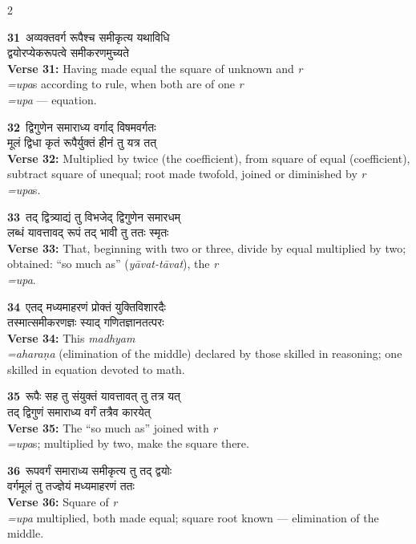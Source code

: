 \documentclass[11pt,a4paper]{article}
\newcommand{\dev}[1]{{\devanagarifont #1}}
\newcommand{\iast}[1]{\textit{#1}}
\newcommand{\vnum}[1]{\textcolor{versenumbercolor}{\textbf{#1}}}
\begin{document}
\begin{paracol}{2}

\switchcolumn[0]
\vnum{31}\ \dev{अव्यक्तवर्ग रूपैश्च समीकृत्य यथाविधि}\\
\dev{द्वयोरप्येकरूपत्वे समीकरणमुच्यते}\\
\switchcolumn[1]
\textbf{Verse 31:} Having made equal the square of unknown and \iast{r\\=upa}s according to rule, when both are of one \iast{r\\=upa} --- equation.

\switchcolumn[0]
\vnum{32}\ \dev{द्विगुणेन समाराध्य वर्गाद् विषमवर्गतः}\\
\dev{मूलं द्विधा कृतं रूपैर्युक्तं हीनं तु यत्र तत्}\\
\switchcolumn[1]
\textbf{Verse 32:} Multiplied by twice (the coefficient), from square of equal (coefficient), subtract square of unequal; root made twofold, joined or diminished by \iast{r\\=upa}s.

\switchcolumn[0]
\vnum{33}\ \dev{तद् द्वित्र्याद्यं तु विभजेद् द्विगुणेन समारधम्}\\
\dev{लब्धं यावत्तावद् रूपं तद् भावी तु ततः स्मृतः}\\
\switchcolumn[1]
\textbf{Verse 33:} That, beginning with two or three, divide by equal multiplied by two; obtained: ``so much as'' (\iast{y\=avat-t\=avat}), the \iast{r\\=upa}.

\switchcolumn[0]
\vnum{34}\ \dev{एतद् मध्यमाहरणं प्रोक्तं युक्तिविशारदैः}\\
\dev{तस्मात्समीकरणज्ञः स्याद् गणितज्ञानतत्परः}\\
\switchcolumn[1]
\textbf{Verse 34:} This \iast{madhyam\\=ahara\d na} (elimination of the middle) declared by those skilled in reasoning; one skilled in equation devoted to math.

\switchcolumn[0]
\vnum{35}\ \dev{रूपैः सह तु संयुक्तं यावत्तावत् तु तत्र यत्}\\
\dev{तद् द्विगुणं समाराध्य वर्गं तत्रैव कारयेत्}\\
\switchcolumn[1]
\textbf{Verse 35:} The ``so much as'' joined with \iast{r\\=upa}s; multiplied by two, make the square there.

\switchcolumn[0]
\vnum{36}\ \dev{रूपवर्गं समाराध्य समीकृत्य तु तद् द्वयोः}\\
\dev{वर्गमूलं तु तज्ज्ञेयं मध्यमाहरणं ततः}\\
\switchcolumn[1]
\textbf{Verse 36:} Square of \iast{r\\=upa} multiplied, both made equal; square root known --- elimination of the middle.


\end{paracol}
\end{document}

